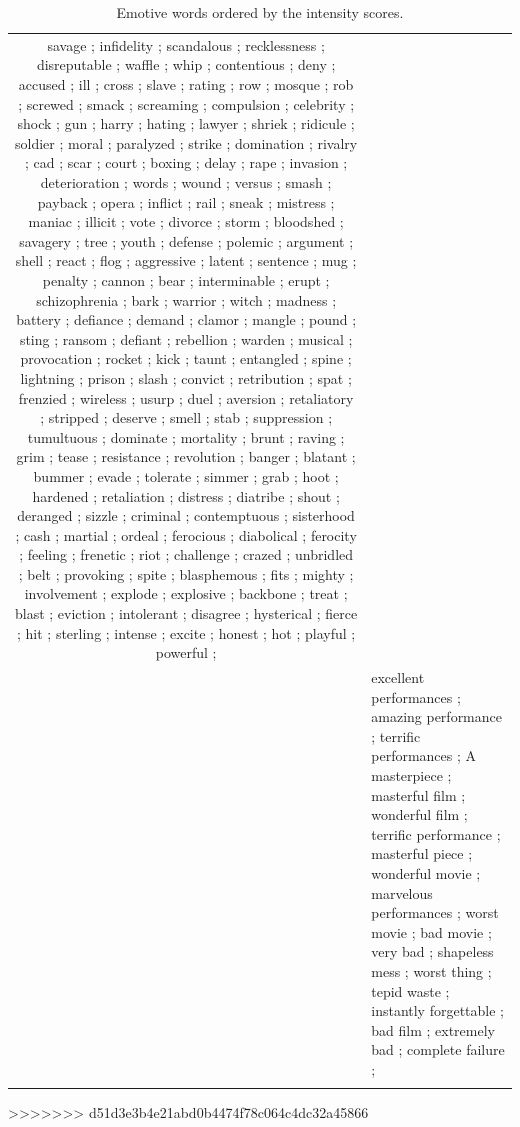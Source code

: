 \documentclass[11pt]{article}
\begin{document}
\begin{table}[th]
\begin{center}
\begin{tabular}{c @{\hspace{0pt}}  @{\hspace{15pt}}p{}}
savage	;
infidelity	;
scandalous	;
recklessness	;
disreputable	;
waffle	;
whip	;
contentious	;
deny	;
accused	;
ill	;
cross	;
slave	;
rating	;
row	;
mosque	;
rob	;
screwed	;
smack	;
screaming	;
compulsion	;
celebrity	;
shock	;
gun	;
harry	;
hating	;
lawyer	;
shriek	;
ridicule	;
soldier	;
moral	;
paralyzed	;
strike	;
domination	;
rivalry	;
cad	;
scar	;
court	;
boxing	;
delay	;
rape	;
invasion	;
deterioration	;
words	;
wound	;
versus	;
smash	;
payback	;
opera	;
inflict	;
rail	;
sneak	;
mistress	;
maniac	;
illicit	;
vote	;
divorce	;
storm	;
bloodshed	;
savagery	;
tree	;
youth	;
defense	;
polemic	;
argument	;
shell	;
react	;
flog	;
aggressive	;
latent	;
sentence	;
mug	;
penalty	;
cannon	;
bear	;
interminable	;
erupt	;
schizophrenia	;
bark	;
warrior	;
witch	;
madness	;
battery	;
defiance	;
demand	;
clamor	;
mangle	;
pound	;
sting	;
ransom	;
defiant	;
rebellion	;
warden	;
musical	;
provocation	;
rocket	;
kick	;
taunt	;
entangled	;
spine	;
lightning	;
prison	;
slash	;
convict	;
retribution	;
spat	;
frenzied	;
wireless	;
usurp	;
duel	;
aversion	;
retaliatory	;
stripped	;
deserve	;
smell	;
stab	;
suppression	;
tumultuous	;
dominate	;
mortality	;
brunt	;
raving	;
grim	;
tease	;
resistance	;
revolution	;
banger	;
blatant	;
bummer	;
evade	;
tolerate	;
simmer	;
grab	;
hoot	;
hardened	;
retaliation	;
distress	;
diatribe	;
shout	;
deranged	;
sizzle	;
criminal	;
contemptuous	;
sisterhood	;
cash	;
martial	;
ordeal	;
ferocious	;
diabolical	;
ferocity	;
feeling	;
frenetic	;
riot	;
challenge	;
crazed	;
unbridled	;
belt	;
provoking	;
spite	;
blasphemous	;
fits	;
mighty	;
involvement	;
explode	;
explosive	;
backbone	;
treat	;
blast	;
eviction	;
intolerant	;
disagree	;
hysterical	;
fierce	;
hit	;
sterling	;
intense	;
excite	;
honest	;
hot	;
playful	;
powerful	;


\\ \addlinespace
2 &
excellent performances ; 
amazing performance ; 
terrific performances ; 
A masterpiece ; 
masterful film ; 
wonderful film ; 
terrific performance ; 
masterful piece ; 
wonderful movie ; 
marvelous performances ; 
worst movie ; 
bad movie ; 
very bad ; 
shapeless mess ; 
worst thing ; 
tepid waste ; 
instantly forgettable ; 
bad film ; 
extremely bad ; 
complete failure ; 


\\\addlinespace\bottomrule[.12em]
\end{tabular}
\caption{Emotive words ordered by the intensity scores.}
\label{table:exPolarity}
\vspace{.4cm}
\end{center}
\end{table}


>>>>>>> d51d3e3b4e21abd0b4474f78c064c4dc32a45866
\end{document}
